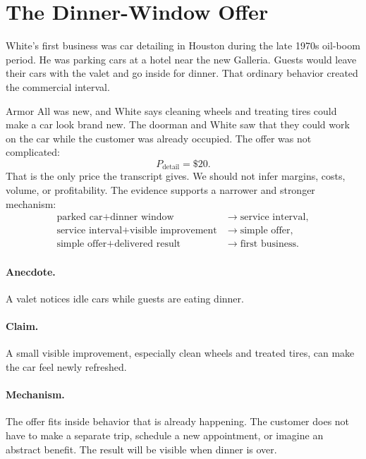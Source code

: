 \documentclass[11pt,oneside]{book}
\begin{document}
\section{The Dinner-Window Offer}

White's first business was car detailing in Houston during the late 1970s oil-boom period. He was parking cars at a hotel near the new Galleria. Guests would leave their cars with the valet and go inside for dinner. That ordinary behavior created the commercial interval.

Armor All was new, and White says cleaning wheels and treating tires could make a car look brand new. The doorman and White saw that they could work on the car while the customer was already occupied. The offer was not complicated:
\[
P_{\mathrm{detail}}=\text{\$20}.
\]
That is the only price the transcript gives. We should not infer margins, costs, volume, or profitability. The evidence supports a narrower and stronger mechanism:
\begin{align}
\text{parked car}+\text{dinner window}
&\longrightarrow \text{service interval},\\
\text{service interval}+\text{visible improvement}
&\longrightarrow \text{simple offer},\\
\text{simple offer}+\text{delivered result}
&\longrightarrow \text{first business}.
\end{align}

\paragraph{Anecdote.}
A valet notices idle cars while guests are eating dinner.

\paragraph{Claim.}
A small visible improvement, especially clean wheels and treated tires, can make the car feel newly refreshed.

\paragraph{Mechanism.}
The offer fits inside behavior that is already happening. The customer does not have to make a separate trip, schedule a new appointment, or imagine an abstract benefit. The result will be visible when dinner is over.
\end{document}
